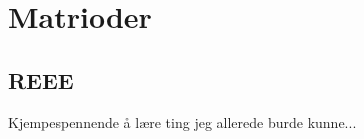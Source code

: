 \section{Matrioder}\label{sec:prob_descr}
\subsection{REEE}
Kjempespennende å lære ting jeg allerede burde kunne...
